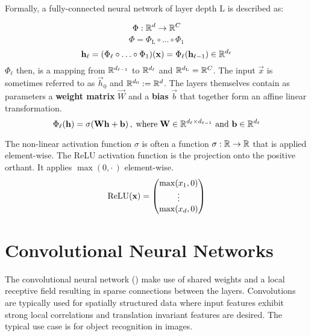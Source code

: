 Formally, a fully-connected neural network of layer depth L is described as:

\[
    \Phi : \mathbb{R}^d \to \mathbb{R}^C
\]
\[
    \Phi = \Phi_\text{L} \circ \ldots \circ \Phi_1
\]
\[
    \mathbf h_\ell = (\Phi_\ell \circ \ldots \circ \Phi_1) (\mathbf x) =
    \Phi_\ell(\mathbf h_{\ell-1}) \in \mathbb{R}^{d_\ell}
\]
$\Phi_\ell$ then, is a mapping from $\mathbb{R}^{d_{\ell-1}}$ to $\mathbb{R}^{d_\ell}$ and $\mathbb{R}^{d_\textnormal{L}} = \mathbb{R}^C$.
The input $\vec x$ is sometimes referred to as $\vec h_0$ and $\mathbb{R}^{d_0} := \mathbb{R}^d$.
The layers themselves contain as parameters a \textbf{weight matrix} $\vec W$ and a \textbf{bias} $\vec b$
that together form an affine linear transformation.
\[
    \Phi_\ell(\mathbf h) = \sigma (\mathbf W \mathbf h + \mathbf b) \,, \; \text{where} \;
    \mathbf W \in \mathbb{R}^{d_\ell \times d_{\ell-1}} \text{ and } 
    \mathbf b \in \mathbb{R}^{d_\ell}
\]

The non-linear activation function $\sigma$ is often a function $\sigma:\mathbb{R}\to\mathbb{R}$ that is applied element-wise.
The ReLU activation function is the projection onto the positive orthant.
It applies $\max(0, \cdot \,)$ element-wise.
\begin{equation}
\label{eqn:relu}
    \operatorname{\textnormal{ReLU}}(\mathbf x) = 
    \begin{pmatrix}
        \max(x_1, 0) \\
        \vdots \\
        \max(x_d, 0) \\
    \end{pmatrix}
\end{equation}


\section{Convolutional Neural Networks}
\label{sec:convolutions}
The convolutional neural network (\cite{Convnet_origins}) 
make use of shared weights and a local receptive field 
resulting in sparse connections between the layers. 
Convolutions are typically used for spatially structured data 
where input features exhibit strong local correlations and 
translation invariant features are desired.
The typical use case is for object recognition in images.

